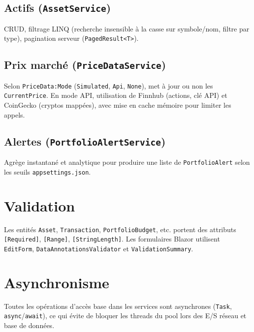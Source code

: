 \subsection{Actifs (\texttt{AssetService})}

CRUD, filtrage LINQ (recherche insensible à la casse sur symbole/nom, filtre par type), pagination serveur (\texttt{PagedResult<T>}).

\subsection{Prix marché (\texttt{PriceDataService})}

Selon \texttt{PriceData:Mode} (\texttt{Simulated}, \texttt{Api}, \texttt{None}), met à jour ou non les \texttt{CurrentPrice}. En mode API, utilisation de Finnhub (actions, clé API) et CoinGecko (cryptos mappées), avec mise en cache mémoire pour limiter les appels.

\subsection{Alertes (\texttt{PortfolioAlertService})}

Agrège instantané et analytique pour produire une liste de \texttt{PortfolioAlert} selon les seuils \texttt{appsettings.json}.

\section{Validation}

Les entités \texttt{Asset}, \texttt{Transaction}, \texttt{PortfolioBudget}, etc. portent des attributs \texttt{[Required]}, \texttt{[Range]}, \texttt{[StringLength]}. Les formulaires Blazor utilisent \texttt{EditForm}, \texttt{DataAnnotationsValidator} et \texttt{ValidationSummary}.

\section{Asynchronisme}

Toutes les opérations d'accès base dans les services sont asynchrones (\texttt{Task}, \texttt{async}/\texttt{await}), ce qui évite de bloquer les threads du pool lors des E/S réseau et base de données.
